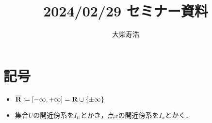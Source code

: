\theoremstyle{mystyle}
\newtheorem{AXM}{公理}[section]
\newtheorem{DFN}[AXM]{定義}
\newtheorem{THM}[AXM]{定理}
\newtheorem*{THM*}{定理}
\newtheorem{PRP}[AXM]{命題}
\newtheorem{LMM}[AXM]{補題}
\newtheorem{CRL}[AXM]{系}
\newtheorem{EG}[AXM]{例}
\newtheorem*{EG*}{例}
\newtheorem{RMK}[AXM]{注意}
\newtheorem{CNV}[AXM]{約束}
\newtheorem{CMT}[AXM]{コメント}
\newtheorem*{CMT*}{コメント}
\newtheorem{NTN}[AXM]{記号}


\usepackage{framed}
\renewenvironment{leftbar}{%
  \def\FrameCommand{\textcolor{lightgray}{\vrule width 4pt} \hspace{10pt}}%
  \MakeFramed {\advance\hsize-\width \FrameRestore}}%
{\endMakeFramed}
\newenvironment{redleftbar}{%
  \def\FrameCommand{\textcolor{lightgray}{\vrule width 1pt} \hspace{10pt}}%
  \MakeFramed {\advance\hsize-\width \FrameRestore}}%
 {\endMakeFramed}








\def\inner<#1>{\langle #1 \rangle}








\title{2024/02/29 セミナー資料}
\author{大柴寿浩}
\date{}

\maketitle

\section*{記号}
\begin{itemize}
    \item \(\overline{\mathbf{R}}\coloneqq \left[-\infty,+\infty\right]=\mathbf{R}\cup\{\pm\infty\}\)
    \item 集合\(U\)の開近傍系を\(I_U\)とかき，点\(x\)の開近傍系を\(I_x\)とかく．
\end{itemize}



